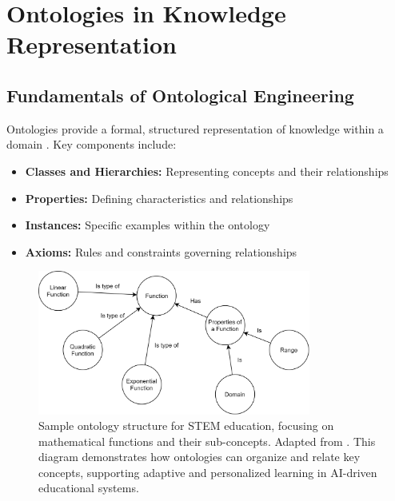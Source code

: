 \section{Ontologies in Knowledge Representation}

\subsection{Fundamentals of Ontological Engineering}
Ontologies provide a formal, structured representation of knowledge within a domain \cite{nananukul2023halo}. Key components include:

\begin{itemize}
    \item \textbf{Classes and Hierarchies:} Representing concepts and their relationships
    \item \textbf{Properties:} Defining characteristics and relationships
    \item \textbf{Instances:} Specific examples within the ontology
    \item \textbf{Axioms:} Rules and constraints governing relationships
\end{itemize}

\begin{figure}[ht]
    \centering
    \includegraphics[width=0.8\textwidth]{figures/diagrams/ExampleOntology.png}
    \caption{Sample ontology structure for STEM education, focusing on mathematical functions and their sub-concepts. Adapted from \cite{hare2024ontology}. This diagram demonstrates how ontologies can organize and relate key concepts, supporting adaptive and personalized learning in AI-driven educational systems.}
    \label{fig:ontology-math-functions}
\end{figure}

